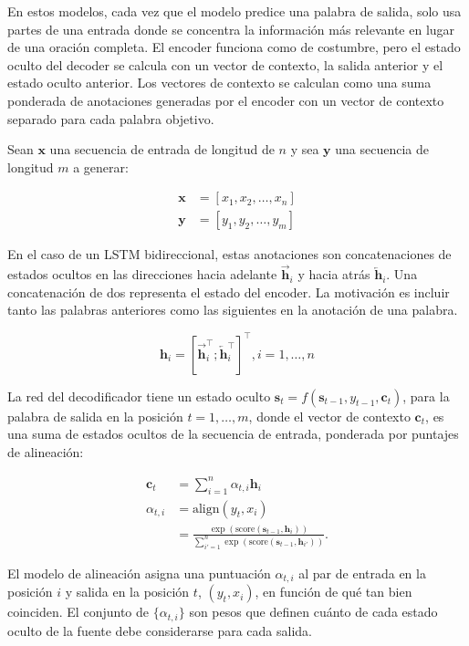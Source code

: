 \documentclass[conference]{IEEEtran}
\begin{document}
En estos modelos, cada vez que el modelo predice una palabra de salida, solo usa partes de una entrada donde se concentra la información m\'as relevante en lugar de una oraci\'on completa. El encoder funciona como de costumbre, pero el estado oculto del decoder se calcula con un vector de contexto, la salida anterior y el estado oculto anterior. Los vectores de contexto se calculan como una suma ponderada de anotaciones generadas por el encoder con un vector de contexto separado para cada palabra objetivo. 


Sean $\mathbf{x}$ una secuencia de entrada de longitud de $n$ y sea $\mathbf{y}$ una secuencia de longitud $m$ a generar:



\begin{align*}
	\mathbf{x} &= [x_1, x_2, \dots, x_n] \\
	\mathbf{y} &= [y_1, y_2, \dots, y_m]
\end{align*}

En el caso de un LSTM bidireccional, estas anotaciones son concatenaciones de estados ocultos en las direcciones hacia adelante $\overrightarrow{\boldsymbol{h}}_i$ y hacia atr\'as $\overleftarrow{\boldsymbol{h}}_i$. Una concatenaci\'on de dos representa el estado del encoder. La motivaci\'on es incluir tanto las palabras anteriores como las siguientes en la anotaci\'on de una palabra.

\[
\boldsymbol{h}_i = [\overrightarrow{\boldsymbol{h}}_i^\top; \overleftarrow{\boldsymbol{h}}_i^\top]^\top, i=1,\dots,n
\]


La red del decodificador tiene un estado oculto $\boldsymbol{s}_t=f(\boldsymbol{s}_{t-1}, y_{t-1}, \mathbf{c}_t)$, para la palabra de salida en la posici\'on $t=1,\dots,m$, donde el vector de contexto $\mathbf{c}_t$, es una suma de estados ocultos de la  secuencia de entrada, ponderada por puntajes de alineaci\'on:


\begin{align*}
	\mathbf{c}_t &= \sum_{i=1}^n \alpha_{t,i} \boldsymbol{h}_i \\
	\alpha_{t,i} &= \text{align}(y_t, x_i) \\
	&= \frac{\exp(\text{score}(\boldsymbol{s}_{t-1}, \boldsymbol{h}_i))}{\sum_{i'=1}^n \exp(\text{score}(\boldsymbol{s}_{t-1}, \boldsymbol{h}_{i'}))}.
\end{align*}


El modelo de alineaci\'on asigna una puntuaci\'on $\alpha_{t,i}$ al par de entrada en la posici\'on $i$ y salida en la posici\'on $t$, $(y_t, x_i)$, en funci\'on de qu\'e tan bien coinciden. El conjunto de $\{\alpha_{t, i}\}$ son pesos que definen cu\'anto de cada estado oculto de la fuente debe considerarse para cada salida.
\end{document}
